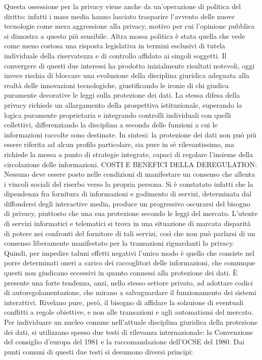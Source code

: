 Questa ossessione per la privacy viene anche da un’operazione di politica del diritto: infatti i mass media hanno lasciato trasparire l’avvento delle nuove tecnologie come mera aggressione alla privacy, motivo per cui l’opinione pubblica si dimostra a questo più sensibile. Altra mossa politica è stata quella che vede come meno costosa una risposta legislativa in termini esclusivi di tutela individuale della riservatezza e di controllo affidato ai singoli soggetti.
Il convergere di questi due interessi ha prodotto inizialmente risultati notevoli, oggi invece rischia di bloccare una evoluzione della disciplina giuridica adeguata alla realtà delle innovazioni tecnologiche, giustificando le ironie di chi giudica puramente decorative le leggi sulla protezione dei dati. 
La stessa difesa della privacy richiede un allargamento della prospettiva istituzionale, superando la logica puramente proprietaria e integrando controlli individuali con quelli collettivi, differenziando la disciplina a seconda delle funzioni a cui le informazioni raccolte sono destinate.
In sintesi: la protezione dei dati non può più essere riferita ad alcun profilo particolare, sia pure in sè rilevantissimo, ma richiede la messa a punto di strategie integrate, capaci di regolare l’insieme della circolazione delle informazioni. 
COSTI E BENEFICI DELLA DEREGULATION:
Nessuno deve essere posto nelle condizioni di manifestare un consenso che allenta i vincoli sociali del riserbo verso la propria persona. Si è constatato infatti che la dipendenza fra fornitura di informazioni e godimento di servizi, determinata dal diffondersi degli interactive media, produce un progressivo oscurarsi del bisogno di privacy, piuttosto che una sua protezione secondo le leggi del mercato. L’utente di servizi informatici e telematici si trova in una situazione di marcata disparità di potere nei confronti del fornitore di tali servizi, così che non può parlarsi di un consenso liberamente manifestato per la transazioni riguardanti la privacy. Quindi, per impedire taluni effetti negativi l’unico modo è quello che consiste nel porre determinati oneri a carico dei raccoglitori delle informazioni, che comunque questi non giudicano eccessivi in quanto connessi alla protezione dei dati.
È presente una forte tendenza, anzi, nello stesso settore privato, ad adottare codici di autoregolamentazione, che mirano a salvaguardare il funzionamento dei sistemi interattivi. Rivelano pure, però, il bisogno di affidare la solzuione di eventuali conflitti a regole obiettive, e non alle transazioni e agli automatismi del mercato.
Per individuare un nucleo comune nell’attuale disciplina giuridica della protezione dei dati, si utilizzano spesso due testi di rilevanza internazionale: la Convenzione del consiglio d’europa del 1981 e la raccomandazione dell’OCSE del 1980. Dai punti comuni di questi due testi si desumono diversi principi:
